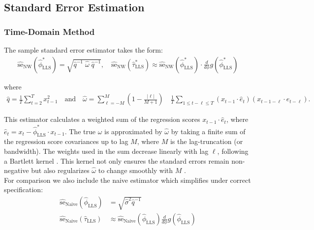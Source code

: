 \documentclass[main.tex]{subfiles}
\begin{document}
\subsection{Standard Error Estimation}
\subsubsection{Time-Domain Method}\label{sec:stderr-time-domain_}
The sample standard error estimator takes the form:
\begin{align}\label{eq:stderr-time-domain_}
\widehat{\text{se}}_{\text{NW}}(\hat\phi^*_{\scriptscriptstyle\text{LLS}}) = \sqrt{\hat q^{-1}\;\hat\omega\; \hat q^{-1}}, \quad
\widehat{\text{se}}_{\text{NW}}(\hat\tau^*_{\scriptscriptstyle\text{LLS}}) \approx \widehat{\text{se}}_{\text{NW}}(\hat\phi^*_{\scriptscriptstyle\text{LLS}}) \cdot \frac{d}{d\phi} g(\hat\phi^*_{\scriptscriptstyle\text{LLS}})
\end{align}

\noindent where
\begin{align}\label{eq:lls_q_omega_}
    \hat q = \frac{1}{T} \sum_{t=2}^T x_{t-1}^2 \quad\text{and}\quad
    \hat \omega = \sum_{\ell=-M}^M \left(1 - \frac{|\ell|}{M+1}\right) \quad \frac{1}{T} \sum_{1\le t - \ell \le T} (x_{t-1} \cdot \hat e_t)(x_{t-1-\ell} \cdot \hat e_{t-\ell}).
\end{align}

\noindent This estimator calculates a weighted sum of the regression scores $x_{t-1} \cdot \hat e_t$, where $\hat e_t = x_t - \hat\phi^*_{\scriptscriptstyle\text{LLS}} \cdot x_{t-1}$. The true $\omega$ is approximated by $\hat \omega$ by taking a finite sum of the regression score covariances up to lag $M$, where $M$ is the lag-truncation (or bandwidth). The weights used in the sum decrease linearly with lag $\ell$, following a Bartlett kernel \citep{newey_simple_1987}. This kernel not only ensures the standard errors remain non-negative but also regularizes $\hat \omega$ to change smoothly with $M$ \citep[Chapter~14.35]{hansen_econometrics_2022}.\\

\noindent For comparison we also include the naive estimator which simplifies under correct specification:
\begin{align} 
    \widehat{\text{se}}_\text{Naive}(\hat\phi_{\scriptscriptstyle\text{LLS}}) &= \sqrt{\hat\sigma^2 \hat q^{-1}}\\
    \widehat{\text{se}}_\text{Naive}(\hat\tau_{\scriptscriptstyle\text{LLS}}) &\approx \widehat{\text{se}}_{\text{Naive}}(\hat\phi_{\scriptscriptstyle\text{LLS}}) \frac{d}{d\phi} g(\hat\phi_{\scriptscriptstyle\text{LLS}})
\end{align}
\end{document}
